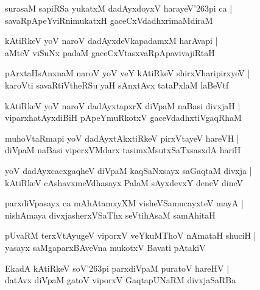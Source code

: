\begin{shloka}
surasaM sapiRSa yukatxM dadAyxdoyxV harayeV\char'263pi ca |\\
savaRpApeYviRnimukatxH gaceCxVdadhxrimaMdiraM
\end{shloka}

\begin{shloka}
kAtiRkeV yoV naroV dadAyxdeVkapadamxM harAvapi |\\
aMteV viSuNx padaM gaceCxVtasxvaRpApavivajiRtaH 
\end{shloka}

\begin{shloka}
pArxtaHsAnxnaM naroV yoV veY kAtiRkeV shirxVharipirxyeV |\\
karoVti savaRtiVtheRSu yaH sAnxtAvx tataPxlaM laBeVtf
\end{shloka}

\begin{shloka}
kAtiRkeV yoV naroV dadAyxtapxrX diVpaM naBasi divxjaH |\\
viparxhatAyxdiBiH pApeYmuRkotxV gaceVdadhxtiVgaqRhaM
\end{shloka}

\begin{shloka}
muhoVtaRmapi yoV dadAyxtAkxtiRkeV pirxVtayeV hareVH |\\
diVpaM naBasi viperxVMdarx tasimxMsutxSaTxsasxdA hariH
\end{shloka}

\begin{shloka}
yoV dadAyxcacxgaqheV diVpaM kaqSaNxsayx saGaqtaM divxja |\\
kAtiRkeV cAshavxmeVdhasayx PalaM sAyxdevxY deneV dineV
\end{shloka}

\begin{shloka}
parxdiVpasayx ca mAhAtamxyXM visheVSamucayxteV mayA |\\
nishAmaya divxjasherxVSaThx seVtihAsaM samAhitaH 
\end{shloka}

\begin{shloka}
pUvaRM terxVtAyugeV viporxV veYkuMThoV nAmataH shuciH |\\
yasayx saMgaparxBAveVna mukotxV Bavati pAtakiV
\end{shloka}

\begin{shloka}
EkadA kAtiRkeV soV\char'263pi parxdiVpaM puratoV hareHV |\\
datAvx diVpaM gatoV viporxV GaqtapUNaRM divxjaSaRBa
\end{shloka}

